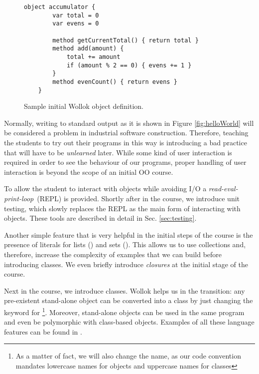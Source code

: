 \vspace{-3mm}
\begin{figure}[ht]
 \centering
 \begin{lstlisting}[language=Wollok]
	object accumulator {
		var total = 0
		var evens = 0
		
		method getCurrentTotal() { return total }
		method add(amount) { 
			total += amount 
			if (amount % 2 == 0) { evens += 1 }
		}
		method evenCount() { return evens }
	}\end{lstlisting}
\vspace{-3mm}
\caption{\small Sample initial Wollok object definition.}
\label{fig:helloWorld/wollok}
\end{figure}
\vspace{-3mm}

Normally, writing to standard output as it is shown in Figure \ref{fig:helloWorld} will be considered a problem in industrial software construction.
Therefore, teaching the students to try out their programs in this way is introducing a bad practice that will have to be \emph{unlearned} later.
While some kind of user interaction is required in order to see the behaviour of our programs, proper handling of user interaction is beyond the scope of an initial OO course.

To allow the student to interact with objects while avoiding I/O a \emph{read-eval-print-loop}~(REPL) is provided.
Shortly after in the course, we introduce unit testing, 
which slowly replaces the REPL as the main form of interacting with objects. 
These tools are described in detail in Sec. \ref{sec:testing}.

Another simple feature that is very helpful in the initial steps of the course is the presence of literals for lists (\eg \code{[1,2,3]}) and sets (\eg {}).
This allows us to use collections and, therefore, increase the complexity of examples that we can build before introducing classes.
We even briefly introduce \emph{closures} at the initial stage of the course.

Next in the course, we introduce classes.
Wollok helps us in the transition: any pre-existent stand-alone object can be converted into a class by just changing the keyword  for %
\footnote{As a matter of fact, we will also change the name, as our code convention mandates lowercase names for objects and uppercase names for classes}.
Moreover, stand-alone objects can be used in the same program and even be polymorphic with class-based objects.
Examples of all these language features can be found in \cite{passerini2017wollok}.

